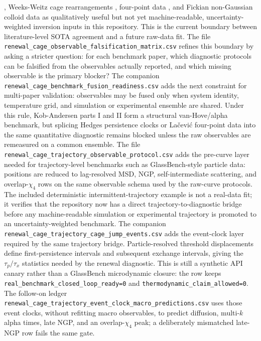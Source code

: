 \documentclass[aps,preprint,onecolumn,superscriptaddress,nofootinbib]{revtex4-2}
\begin{document}
\cite{hedges2007persistence}, Weeks-Weitz cage rearrangements
\cite{weeks2002cage}, four-point data \cite{lacevic2003fourpoint}, and
Fickian non-Gaussian colloid data \cite{guan2014fickian} as qualitatively
useful but not yet machine-readable, uncertainty-weighted inversion inputs in
this repository. This is the current boundary between literature-level SOTA
agreement and a future raw-data fit.
The file
\texttt{renewal\_cage\_observable\_falsification\_matrix.csv} refines this
boundary by asking a stricter question: for each benchmark paper, which
diagnostic protocols can be falsified from the observables actually reported,
and which missing observable is the primary blocker?
The companion
\texttt{renewal\_cage\_benchmark\_fusion\_readiness.csv} adds the next
constraint for multi-paper validation: observables may be fused only when
system identity, temperature grid, and simulation or experimental ensemble are
shared. Under this rule, Kob-Andersen parts I and II form a structural
van-Hove/alpha benchmark, but splicing Hedges persistence clocks or
La{\v{c}}evi{\'c} four-point data into the same quantitative diagnostic remains
blocked unless the raw observables are remeasured on a common ensemble.
The file
\texttt{renewal\_cage\_trajectory\_observable\_protocol.csv} adds the
pre-curve layer needed for trajectory-level benchmarks such as GlassBench-style
particle data: positions are reduced to lag-resolved MSD, NGP,
self-intermediate scattering, and overlap-$\chi_4$ rows on the same observable
schema used by the raw-curve protocols. The included deterministic
intermittent-trajectory example is not a real-data fit; it verifies that the
repository now has a direct trajectory-to-diagnostic bridge before any
machine-readable simulation or experimental trajectory is promoted to an
uncertainty-weighted benchmark.
The companion
\texttt{renewal\_cage\_trajectory\_cage\_jump\_events.csv} adds the event-clock
layer required by the same trajectory bridge. Particle-resolved threshold
displacements define first-persistence intervals and subsequent exchange
intervals, giving the \(\tau_p/\tau_x\) statistics needed by the renewal
diagnostic. This is still a synthetic API canary rather than a GlassBench
microdynamic closure: the row keeps
\texttt{real\_benchmark\_closed\_loop\_ready=0} and
\texttt{thermodynamic\_claim\_allowed=0}.
The follow-on ledger
\texttt{renewal\_cage\_trajectory\_event\_clock\_macro\_predictions.csv}
uses those event clocks, without refitting macro observables, to predict
diffusion, multi-\(k\) alpha times, late NGP, and an overlap-\(\chi_4\) peak;
a deliberately mismatched late-NGP row fails the same gate.
\end{document}

